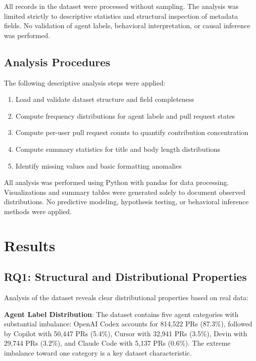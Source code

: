 \documentclass[conference]{IEEEtran}
\begin{document}
All records in the dataset were processed without sampling. The analysis was limited strictly to descriptive statistics and structural inspection of metadata fields. No validation of agent labels, behavioral interpretation, or causal inference was performed.

\subsection{Analysis Procedures}

The following descriptive analysis steps were applied:

\begin{enumerate}
    \item Load and validate dataset structure and field completeness
    \item Compute frequency distributions for agent labels and pull request states
    \item Compute per-user pull request counts to quantify contribution concentration
    \item Compute summary statistics for title and body length distributions
    \item Identify missing values and basic formatting anomalies
\end{enumerate}

All analysis was performed using Python with pandas for data processing. Visualizations and summary tables were generated solely to document observed distributions. No predictive modeling, hypothesis testing, or behavioral inference methods were applied.

\section{Results}

\subsection{RQ1: Structural and Distributional Properties}

Analysis of the dataset reveals clear distributional properties based on real data:

\textbf{Agent Label Distribution}: The dataset contains five agent categories with substantial imbalance: OpenAI Codex accounts for 814,522 PRs (87.3\%), followed by Copilot with 50,447 PRs (5.4\%), Cursor with 32,941 PRs (3.5\%), Devin with 29,744 PRs (3.2\%), and Claude Code with 5,137 PRs (0.6\%). The extreme imbalance toward one category is a key dataset characteristic.
\end{document}
